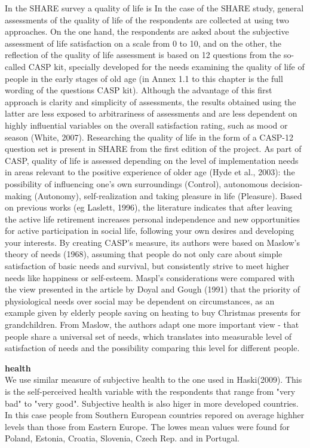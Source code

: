 \documentclass[10pt, letterpaper]{article}
\begin{document}
\begin{spacing}{1.4}
In the SHARE survey a quality of life is 
In the case of the SHARE study, general assessments of the quality of life of the respondents are collected at
using two approaches. On the one hand, the respondents are asked about the subjective assessment of life satisfaction on a scale from 0 to 10,
and on the other, the reflection of the quality of life assessment is based on 12 questions from the so-called CASP kit, specially developed for the needs
examining the quality of life of people in the early stages of old age (in Annex 1.1 to this chapter is the full wording of the questions
CASP kit). Although the advantage of this first approach is clarity and simplicity of assessments, the results obtained using
the latter are less exposed to arbitrariness of assessments and are less dependent on highly influential variables
on the overall satisfaction rating, such as mood or season (White, 2007). Researching the quality of life in the form of a CASP-12 question set
is present in SHARE from the first edition of the project. As part of CASP, quality of life is assessed depending on the level of implementation
needs in areas relevant to the positive experience of older age (Hyde et al., 2003): the possibility of influencing one's own
surroundings (Control), autonomous decision-making (Autonomy), self-realization and taking pleasure in
life (Pleasure). Based on previous works (eg Laslett, 1996), the literature indicates that after leaving the active life
retirement increases personal independence and new opportunities for active participation in social life,
following your own desires and developing your interests.
By creating CASP's measure, its authors were based on Maslow's theory of needs (1968), assuming that people do not only care about
simple satisfaction of basic needs and survival, but consistently strive to meet higher needs like happiness
or self-esteem. Maspl's considerations were compared with the view presented in the article by Doyal and Gough
(1991) that the priority of physiological needs over social may be dependent on circumstances, as an example given by elderly people
saving on heating to buy Christmas presents for grandchildren. From Maslow, the authors adapt one more important view
- that people share a universal set of needs, which translates into measurable level of satisfaction of needs and the possibility
comparing this level for different people. 



\textbf{health} \\
We use similar measure of subjective health to the one used in Haski(2009). This is the self-perceived health variable with the respondents that range from "very bad" to "very good". Subjective health is also higer in more developed countries. In this case people from Southern European countries repored on average highher levels than those from Eastern Europe. The lowes mean values were found for Poland, Estonia, Croatia, Slovenia, Czech Rep. and in Portugal.


\end{spacing}
\end{document}
